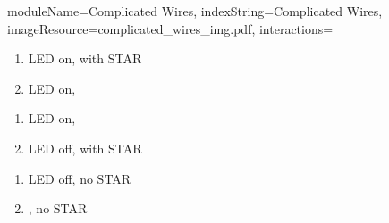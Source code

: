 \documentclass{../../ktane-mod}
\begin{document}
\begin{module}{
  moduleName=Complicated Wires,
  indexString=Complicated Wires,
  imageResource=complicated_wires_img.pdf,
  interactions=\keysymbol
}
\begin{minipage}[t]{0.48\textwidth}
\begin{enumerate}
  \renewcommand{\labelenumi}{\alph{enumi}.}
  \item LED on,  with STAR
  \item LED on, \RED
\end{enumerate}
\end{minipage}
\hfill
\begin{minipage}[t]{0.48\textwidth}
\begin{enumerate}
  \renewcommand{\labelenumi}{\alph{enumi}.}
  \item LED on, \BLUE
  \item LED off, \PURPLE with STAR
\end{enumerate}

\vspace{0.5cm}

\begin{enumerate}
  \renewcommand{\labelenumi}{\alph{enumi}.}
  \setcounter{enumi}{2}
  \item LED off, no STAR
  \item \PURPLE, no STAR
\end{enumerate}
\end{minipage}

\vspace{1.5cm}

\begin{center}
\large{}
\end{center}


\end{module}
\end{document}
